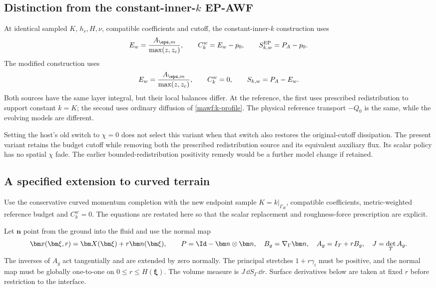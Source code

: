 \subsection{Distinction from the constant-inner-\texorpdfstring{\(k\)}{k} EP-AWF}
\label{mawf:comparison}
At identical sampled \(K\), \(h_r,H,\nu\), compatible coefficients
and cutoff, the constant-inner-\(k\) construction uses
\[
 E_w=\frac{A_{\eps,m}}{\max(z,z_c)},\qquad
 C_k^w=E_w-p_0,\qquad S_{k,w}^{\rm EP}=P_A-p_0.
\]
The modified construction uses
\[
 E_w=\frac{A_{\eps,m}}{\max(z,z_c)},\qquad
 C_k^w=0,\qquad S_{k,w}=P_A-E_w.
\]
Both sources have the same layer integral, but their local
balances differ. At the reference, the first uses prescribed
redistribution to support constant \(k=K\); the second uses
ordinary diffusion of \cref{mawf:k-profile}.
The physical reference transport \(-Q_0\) is the same,
while the evolving models are different.

Setting the host's old switch to \(\chi=0\) does not select this
variant when that switch also restores the original-cutoff
dissipation. The present variant retains the budget cutoff
while removing both the prescribed redistribution source and
its equivalent auxiliary flux. Its scalar policy has no
spatial \(\chi\) fade. The earlier bounded-redistribution
positivity remedy would be a further model change if retained.

\subsection{A specified extension to curved terrain}
\label{mawf:curved}
Use the conservative curved momentum completion with the new
endpoint sample \(K=k|_{\Gamma_H}\), compatible coefficients,
metric-weighted reference budget and \(C_k^w=0\).
The equations are restated here so that the scalar replacement
and roughness-force prescription are explicit.

Let \(\bm n\) point from the ground into the fluid and use the
normal map
\begin{equation}
 \bm x(\bm\xi,r)=\bm X(\bm\xi)+r\bm n(\bm\xi),\qquad
 P=\Id-\bm n\otimes\bm n,\quad B_g=\nabla_\Gamma\bm n,\quad
 A_g=I_T+rB_g,\quad J=\det_TA_g.
 \label{mawf:map}
\end{equation}
The inverses of \(A_g\) act tangentially and are extended by zero
normally. The principal stretches \(1+r\gamma_i\) must be
positive, and the normal map must be globally one-to-one on
\(0\le r\le H(\bm\xi)\). The volume measure is
\(J\,\dd S_\Gamma\,\dd r\). Surface derivatives below are
taken at fixed \(r\) before restriction to the interface.

